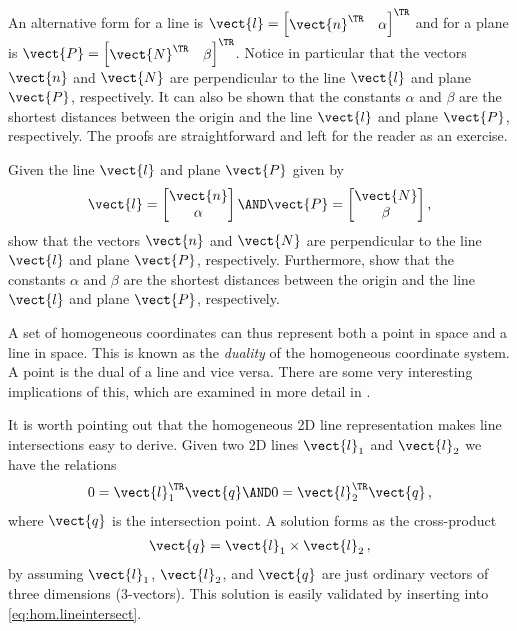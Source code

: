 \documentclass[oneandhalfcolumn]{coursenotes-handout}
\begin{document}
An alternative form for a line is \(\vect{l} = \begin{bmatrix} \vect{n}^{\TR} & \alpha \end{bmatrix}^{\TR}\) and for a plane is \(\vect{P} = \begin{bmatrix} \vect{N}^{\TR} & \beta \end{bmatrix}^{\TR}\). Notice in particular that the vectors \(\vect{n}\) and \(\vect{N}\) are perpendicular to the line \(\vect{l}\) and plane \(\vect{P}\), respectively. It can also be shown that the constants \(\alpha\) and \(\beta\) are the shortest distances between the origin and the line \(\vect{l}\) and plane \(\vect{P}\), respectively. The proofs are straightforward and left for the reader as an exercise.

\begin{exercise}
  Given the line \(\vect{l}\) and plane \(\vect{P}\) given by
  \begin{align}
      \vect{l} =  \begin{bmatrix} \vect{n} \\ \alpha \end{bmatrix} \AND
      \vect{P} =  \begin{bmatrix} \vect{N} \\ \beta \end{bmatrix},
  \end{align}
  show that the vectors \(\vect{n}\) and \(\vect{N}\) are perpendicular to the line \(\vect{l}\) and plane \(\vect{P}\), respectively. Furthermore, show that the constants \(\alpha\) and \(\beta\) are the shortest distances between the origin and the line \(\vect{l}\) and plane \(\vect{P}\), respectively.
\end{exercise}

A set of homogeneous coordinates can thus represent both a point in space and a line in space. This is known as the \emph{duality} of the homogeneous coordinate system. A point is the dual of a line and vice versa. There are some very interesting implications of this, which are examined in more detail in \cite{hartley2003}.

It is worth pointing out that the homogeneous 2D line representation makes line intersections easy to derive. Given two 2D lines \(\vect{l}_1\) and \(\vect{l}_2\) we have the relations
\begin{align}
0 = \vect{l}_1^{\TR} \vect{q} \AND
0 = \vect{l}_2^{\TR} \vect{q} \label{eq:hom.lineintersect} \,,
\end{align}
where \(\vect{q}\) is the intersection point. A solution forms as the cross-product
\begin{align}
\vect{q} = \vect{l}_1 \times \vect{l}_2 \,,
\end{align}
by assuming \(\vect{l}_1\), \(\vect{l}_2\), and \(\vect{q}\) are just ordinary vectors of three dimensions (3-vectors). This solution is easily validated by inserting into \cref{eq:hom.lineintersect}.
\end{document}
